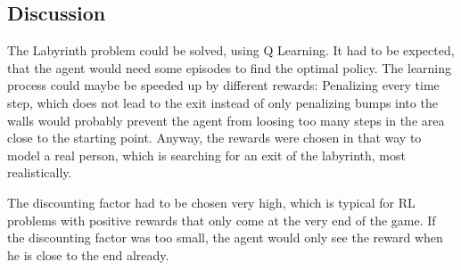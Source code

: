 \documentclass[paper=a4, fontsize=11pt]{scrartcl} %
\numberwithin{equation}{section} %
\numberwithin{figure}{section} %
\numberwithin{table}{section} %
\begin{document}
\subsection{Discussion}

	The Labyrinth problem could be solved, using Q Learning. It had to be expected, that the agent would need some episodes to find the optimal policy. The learning process could maybe be speeded up by different rewards: Penalizing every time step, which does not lead to the exit instead of only penalizing bumps into the walls would probably prevent the agent from loosing too many steps in the area close to the starting point. Anyway, the rewards were chosen in that way to model a real person, which is searching for an exit of the labyrinth, most realistically. 
	
	The discounting factor had to be chosen very high, which is typical for RL problems with positive rewards that only come at the very end of the game. If the discounting factor was too small, the agent would only see the reward when he is close to the end already.




\end{document}
